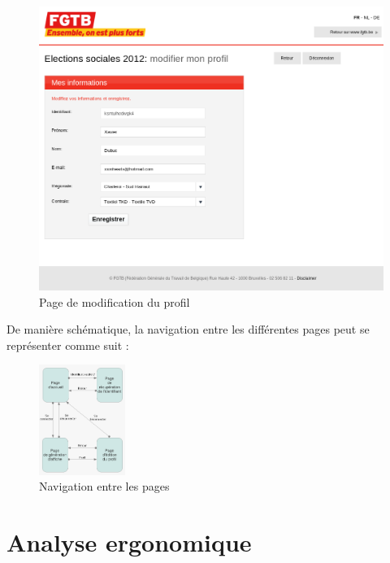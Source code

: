 \documentclass{article}
\begin{document}
\begin{sffamily}
\begin{enumerate}
\begin{figure}[h!]
	 \begin{center}
	   \includegraphics[width=\textwidth]{ergo_022.png} 
	   \caption{Page de modification du profil}
	\end{center}
\end{figure}
\end{enumerate}

De manière schématique, la navigation entre les différentes pages peut se représenter comme suit :

\begin{figure}[h!]
	 \begin{center}
	   \includegraphics[width=0.25\textwidth]{ergo_023.png} 
	   \caption{Navigation entre les pages}
	\end{center}
\end{figure}

\newpage

\section{Analyse ergonomique}


\end{sffamily}
\end{document}
